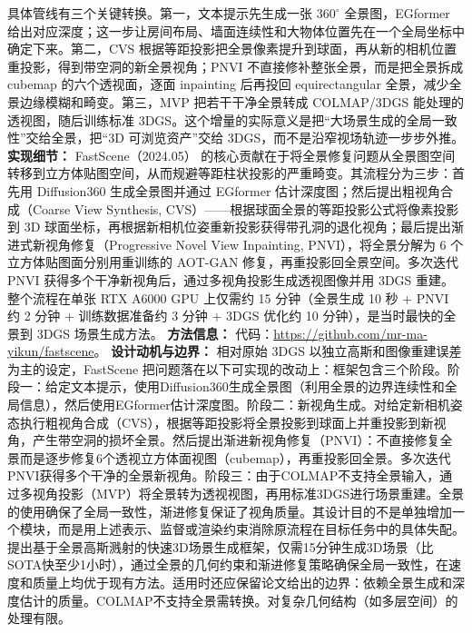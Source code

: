 具体管线有三个关键转换。第一，文本提示先生成一张 $360^\circ$ 全景图，EGformer 给出对应深度；这一步让房间布局、墙面连续性和大物体位置先在一个全局坐标中确定下来。第二，CVS 根据等距投影把全景像素提升到球面，再从新的相机位置重投影，得到带空洞的新全景视角；PNVI 不直接修补整张全景，而是把全景拆成 cubemap 的六个透视面，逐面 inpainting 后再投回 equirectangular 全景，减少全景边缘模糊和畸变。第三，MVP 把若干干净全景转成 COLMAP/3DGS 能处理的透视图，随后训练标准 3DGS。这个增量的实际意义是把“大场景生成的全局一致性”交给全景，把“3D 可浏览资产”交给 3DGS，而不是沿窄视场轨迹一步步外推。
\textbf{实现细节：} FastScene（2024.05） 的核心贡献在于将全景修复问题从全景图空间转移到立方体贴图空间，从而规避等距柱状投影的严重畸变。其流程分为三步：首先用 Diffusion360 生成全景图并通过 EGformer 估计深度图；然后提出粗视角合成（Coarse View Synthesis, CVS）——根据球面全景的等距投影公式将像素投影到 3D 球面坐标，再根据新相机位姿重新投影获得带孔洞的退化视角；最后提出渐进式新视角修复（Progressive Novel View Inpainting, PNVI），将全景分解为 6 个立方体贴图面分别用重训练的 AOT-GAN 修复，再重投影回全景空间。多次迭代 PNVI 获得多个干净新视角后，通过多视角投影生成透视图像并用 3DGS 重建。整个流程在单张 RTX A6000 GPU 上仅需约 15 分钟（全景生成 10 秒 + PNVI 约 2 分钟 + 训练数据准备约 3 分钟 + 3DGS 优化约 10 分钟），是当时最快的全景到 3DGS 场景生成方法。
\textbf{方法信息：} 代码：\url{https://github.com/mr-ma-yikun/fastscene}。
\textbf{设计动机与边界：} 相对原始 3DGS 以独立高斯和图像重建误差为主的设定，FastScene 把问题落在以下可实现的改动上：框架包含三个阶段。阶段一：给定文本提示，使用Diffusion360生成全景图（利用全景的边界连续性和全局信息），然后使用EGformer估计深度图。阶段二：新视角生成。对给定新相机姿态执行粗视角合成（CVS），根据等距投影将全景投影到球面上并重投影到新视角，产生带空洞的损坏全景。然后提出渐进新视角修复（PNVI）：不直接修复全景而是逐步修复6个透视立方体面视图（cubemap），再重投影回全景。多次迭代PNVI获得多个干净的全景新视角。阶段三：由于COLMAP不支持全景输入，通过多视角投影（MVP）将全景转为透视视图，再用标准3DGS进行场景重建。全景的使用确保了全局一致性，渐进修复保证了视角质量。其设计目的不是单独增加一个模块，而是用上述表示、监督或渲染约束消除原流程在目标任务中的具体失配。提出基于全景高斯溅射的快速3D场景生成框架，仅需15分钟生成3D场景（比SOTA快至少1小时），通过全景的几何约束和渐进修复策略确保全局一致性，在速度和质量上均优于现有方法。适用时还应保留论文给出的边界：依赖全景生成和深度估计的质量。COLMAP不支持全景需转换。对复杂几何结构（如多层空间）的处理有限。
